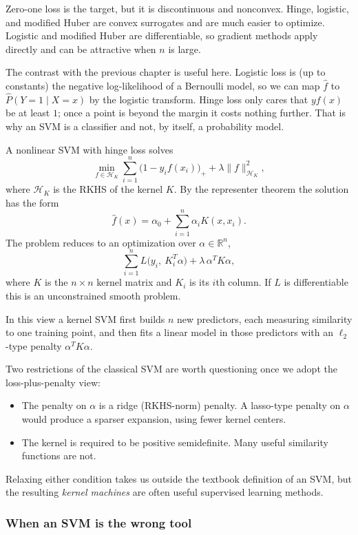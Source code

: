 \documentclass[
]{book}
\providecommand{\tightlist}{%
  \setlength{\itemsep}{0pt}\setlength{\parskip}{0pt}}
\begin{document}
Zero-one loss is the target, but it is discontinuous and nonconvex. Hinge, logistic, and modified Huber are convex surrogates and are much easier to optimize. Logistic and modified Huber are differentiable, so gradient methods apply directly and can be attractive when \(n\) is large.

The contrast with the previous chapter is useful here. Logistic loss is (up to constants) the negative log-likelihood of a Bernoulli model, so we can map \(\hat f\) to \(\widehat{P}(Y=1\mid X=x)\) by the logistic transform. Hinge loss only cares that \(yf(x)\) be at least \(1\); once a point is beyond the margin it costs nothing further. That is why an SVM is a classifier and not, by itself, a probability model.

A nonlinear SVM with hinge loss solves
\[
\min_{f\in\mathcal{H}_K}
\sum_{i=1}^{n}\bigl(1-y_i f(x_i)\bigr)_+
+ \lambda\|f\|_{\mathcal{H}_K}^2,
\]
where \(\mathcal{H}_K\) is the RKHS of the kernel \(K\). By the representer theorem the solution has the form
\[
\hat f(x)=\alpha_0+\sum_{i=1}^{n}\alpha_i K(x,x_i).
\]
The problem reduces to an optimization over \(\alpha\in\mathbb{R}^n\),
\[
\sum_{i=1}^{n} L\bigl(y_i,\ K_i^T\alpha\bigr) + \lambda\,\alpha^T K\alpha,
\]
where \(K\) is the \(n\times n\) kernel matrix and \(K_i\) is its \(i\)th column. If \(L\) is differentiable this is an unconstrained smooth problem.

In this view a kernel SVM first builds \(n\) new predictors, each measuring similarity to one training point, and then fits a linear model in those predictors with an \(\ell_2\)-type penalty \(\alpha^T K\alpha\).

Two restrictions of the classical SVM are worth questioning once we adopt the loss-plus-penalty view:

\begin{itemize}
\tightlist
\item
  The penalty on \(\alpha\) is a ridge (RKHS-norm) penalty. A lasso-type penalty on \(\alpha\) would produce a sparser expansion, using fewer kernel centers.
\item
  The kernel is required to be positive semidefinite. Many useful similarity functions are not.
\end{itemize}

Relaxing either condition takes us outside the textbook definition of an SVM, but the resulting \emph{kernel machines} are often useful supervised learning methods.

\subsubsection*{When an SVM is the wrong tool}\label{when-an-svm-is-the-wrong-tool}
\end{document}
